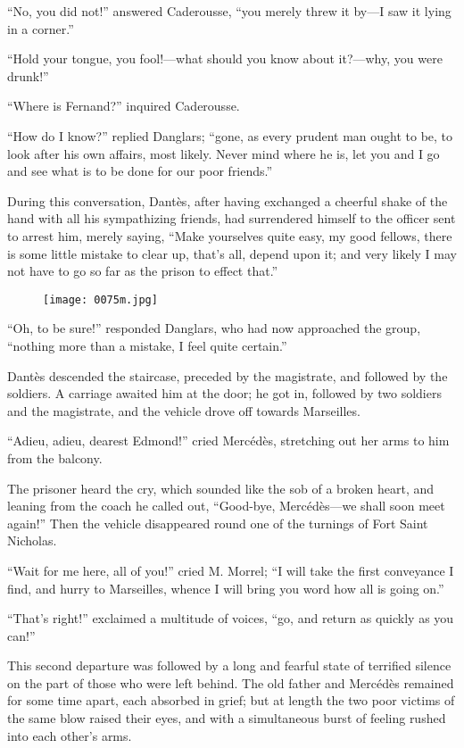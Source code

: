 “No, you did not!” answered Caderousse, “you merely threw it by—I saw
it lying in a corner.”

“Hold your tongue, you fool!—what should you know about it?—why, you
were drunk!”

“Where is Fernand?” inquired Caderousse.

“How do I know?” replied Danglars; “gone, as every prudent man ought to
be, to look after his own affairs, most likely. Never mind where he is,
let you and I go and see what is to be done for our poor friends.”

During this conversation, Dantès, after having exchanged a cheerful
shake of the hand with all his sympathizing friends, had surrendered
himself to the officer sent to arrest him, merely saying, “Make
yourselves quite easy, my good fellows, there is some little mistake to
clear up, that’s all, depend upon it; and very likely I may not have to
go so far as the prison to effect that.”

\begin{figure}[ht]
\texttt{[image: 0075m.jpg]}
\end{figure}

“Oh, to be sure!” responded Danglars, who had now approached the group,
“nothing more than a mistake, I feel quite certain.”

Dantès descended the staircase, preceded by the magistrate, and
followed by the soldiers. A carriage awaited him at the door; he got
in, followed by two soldiers and the magistrate, and the vehicle drove
off towards Marseilles.

“Adieu, adieu, dearest Edmond!” cried Mercédès, stretching out her arms
to him from the balcony.

The prisoner heard the cry, which sounded like the sob of a broken
heart, and leaning from the coach he called out, “Good-bye, Mercédès—we
shall soon meet again!” Then the vehicle disappeared round one of the
turnings of Fort Saint Nicholas.

“Wait for me here, all of you!” cried M. Morrel; “I will take the first
conveyance I find, and hurry to Marseilles, whence I will bring you
word how all is going on.”

“That’s right!” exclaimed a multitude of voices, “go, and return as
quickly as you can!”

This second departure was followed by a long and fearful state of
terrified silence on the part of those who were left behind. The old
father and Mercédès remained for some time apart, each absorbed in
grief; but at length the two poor victims of the same blow raised their
eyes, and with a simultaneous burst of feeling rushed into each other’s
arms.

